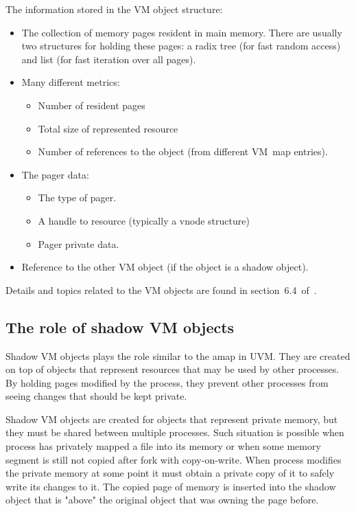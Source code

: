 The information stored in the VM object structure:
\begin{itemize}
  \item The collection of memory pages resident in main memory.
    There are usually two structures for holding these pages:
    a radix tree (for fast random access) and list (for fast iteration over all pages).
  \item Many different metrics:
    \begin{itemize}
      \item Number of resident pages
      \item Total size of represented resource
      \item Number of references to the object (from different VM~map entries).
    \end{itemize}
  \item The pager data:
    \begin{itemize}
      \item The type of pager.
      \item A handle to resource (typically a vnode structure)
      \item Pager private data.
    \end{itemize}
  \item Reference to the other VM object (if the object is a shadow object).
\end{itemize}


Details and topics related to the VM objects are found in section~6.4~of~\cite{mckusick}.

\subsection{The role of shadow VM objects}

Shadow VM objects plays the role similar to the amap in UVM.
They are created on top of objects that represent resources that may be used by other processes.
By holding pages modified by the process, they prevent other processes from seeing changes that should be kept private.

Shadow VM objects are created for objects that represent private memory, but they must be shared between multiple processes.
Such situation is possible when process has privately mapped a file into its memory or when some memory segment is still not copied after fork with copy-on-write.
When process modifies the private memory at some point it must obtain a private copy of it to safely write its changes to it.
The copied page of memory is inserted into the shadow object that is "above" the original object that was owning the page before.

